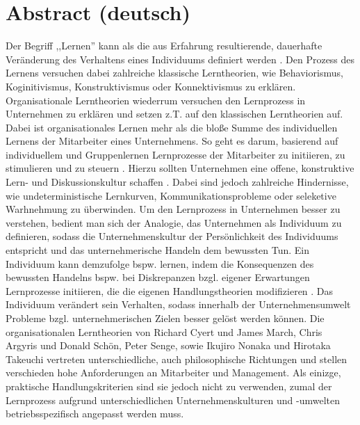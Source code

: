 \documentclass[12pt]{article}
\begin{document}
\maketitle

\section{Abstract (deutsch)}

Der Begriff ,,Lernen'' kann als die aus Erfahrung resultierende, dauerhafte
Veränderung des Verhaltens eines Individuums definiert werden
\cite{Lefrancois:2006}. Den Prozess des Lernens versuchen dabei zahlreiche
klassische Lerntheorien, wie Behaviorismus, Koginitivismus, Konstruktivismus
oder Konnektivismus zu erklären. Organisationale Lerntheorien wiederrum
versuchen den Lernprozess in Unternehmen zu erklären und setzen z.T. auf den
klassischen Lerntheorien auf. Dabei ist organisationales Lernen mehr als die
bloße Summe des individuellen Lernens der Mitarbeiter eines Unternehmens. So
geht es darum, basierend auf individuellem und Gruppenlernen Lernprozesse der
Mitarbeiter zu initiieren, zu stimulieren und zu steuern \cite{Franken:2002}.
Hierzu sollten Unternehmen eine offene, konstruktive Lern- und
Diskussionskultur schaffen \cite{culture}. Dabei sind jedoch zahlreiche
Hindernisse, wie undeterministische Lernkurven, Kommunikationsprobleme oder
seleketive Warhnehmung zu überwinden.  Um den Lernprozess in Unternehmen besser
zu verstehen, bedient man sich der Analogie, das Unternehmen als Individuum zu
definieren, sodass die Unternehmenskultur der Persönlichkeit des Individuums
entspricht und das unternehmerische Handeln dem bewussten Tun. Ein Individuum
kann demzufolge bspw. lernen, indem die Konsequenzen des bewussten Handelns
bspw. bei Diskrepanzen bzgl. eigener Erwartungen Lernprozesse initiieren, die
die eigenen Handlungstheorien modifizieren \cite{Pawlowsky:1992}. Das
Individuum verändert sein Verhalten, sodass innerhalb der Unternehmensumwelt
Probleme bzgl. unternehmerischen Zielen besser gelöst werden können. Die
organisationalen Lerntheorien von Richard Cyert und James March, Chris Argyris
und Donald Schön, Peter Senge, sowie Ikujiro Nonaka und Hirotaka Takeuchi
vertreten unterschiedliche, auch philosophische Richtungen und stellen
verschieden hohe Anforderungen an Mitarbeiter und Management. Als einizge,
praktische Handlungskriterien sind sie jedoch nicht zu verwenden, zumal der
Lernprozess aufgrund unterschiedlichen Unternehmenskulturen und -umwelten
betriebsspezifisch angepasst werden muss.
\end{document}
